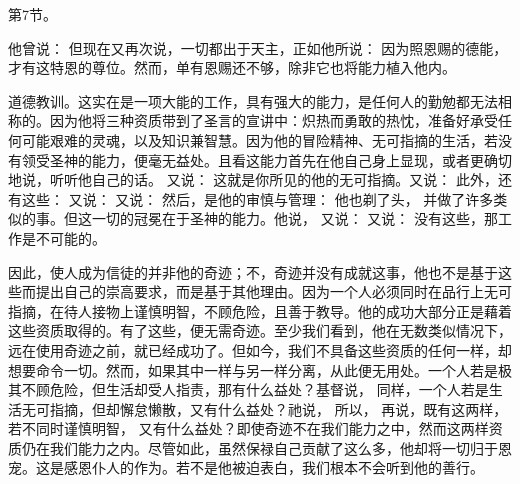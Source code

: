 第7节。\par

他曾说： 但现在又再次说，一切都出于天主，正如他所说： 因为照恩赐的德能，才有这特恩的尊位。然而，单有恩赐还不够，除非它也将能力植入他内。\par

道德教训。这实在是一项大能的工作，具有强大的能力，是任何人的勤勉都无法相称的。因为他将三种资质带到了圣言的宣讲中：炽热而勇敢的热忱，准备好承受任何可能艰难的灵魂，以及知识兼智慧。因为他的冒险精神、无可指摘的生活，若没有领受圣神的能力，便毫无益处。且看这能力首先在他自己身上显现，或者更确切地说，听听他自己的话。 又说： 这就是你所见的他的无可指摘。又说： 此外，还有这些： 又说： 又说： 然后，是他的审慎与管理： 他也剃了头， 并做了许多类似的事。但这一切的冠冕在于圣神的能力。他说， 又说： 又说： 没有这些，那工作是不可能的。\par

因此，使人成为信徒的并非他的奇迹；不，奇迹并没有成就这事，他也不是基于这些而提出自己的崇高要求，而是基于其他理由。因为一个人必须同时在品行上无可指摘，在待人接物上谨慎明智，不顾危险，且善于教导。他的成功大部分正是藉着这些资质取得的。有了这些，便无需奇迹。至少我们看到，他在无数类似情况下，远在使用奇迹之前，就已经成功了。但如今，我们不具备这些资质的任何一样，却想要命令一切。然而，如果其中一样与另一样分离，从此便无用处。一个人若是极其不顾危险，但生活却受人指责，那有什么益处？基督说， 同样，一个人若是生活无可指摘，但却懈怠懒散，又有什么益处？祂说， 所以， 再说，既有这两样，若不同时谨慎明智， 又有什么益处？即使奇迹不在我们能力之中，然而这两样资质仍在我们能力之内。尽管如此，虽然保禄自己贡献了这么多，他却将一切归于恩宠。这是感恩仆人的作为。若不是他被迫表白，我们根本不会听到他的善行。\par

